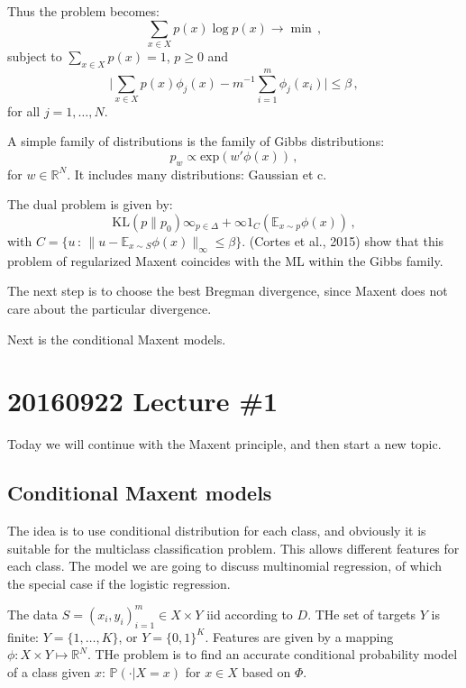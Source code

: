\documentclass[a4paper]{article}
\newcommand{\Real}{\mathbb{R}}
\newcommand{\ex}{\mathbb{E}}
\newcommand{\pr}{\mathbb{P}}
\begin{document}
Thus the problem becomes:
\[ \sum_{x\in X} p(x) \log p(x) \to \min \,, \]
subject to $\sum_{x\in X} p(x) = 1$, $p \geq 0$ and
\[ \bigl|\sum_{x\in X} p(x) \phi_j(x) - m^{-1} \sum_{i=1}^m \phi_j(x_i) \bigr|
    \leq \beta \,,\]
for all $j=1,\ldots, N$.

A simple family of distributions is the family of Gibbs distributions:
\[ p_w \propto \text{exp}(w' \phi(x)) \,, \]
for $w\in \Real^N$. It includes many distributions: Gaussian et c.

The dual problem is given by:
\[ \text{KL}(p\|p_0) \infty_{p\in \Delta} + \infty 1_C(\ex_{x\sim p} \phi(x)) \,,\]
with $C = \{u\,:\, \|u - \ex_{x\sim S} \phi(x) \|_\infty \leq \beta \}$. (Cortes
et al., 2015) show that this problem of regularized Maxent coincides with the ML
within the Gibbs family.

The next step is to choose the best Bregman divergence, since Maxent does not care
about the particular divergence.

\noindent Next is the conditional Maxent models.



% 

\section{20160922 Lecture \#1} %
\label{sec:20160922_lecture_1}

Today we will continue with the Maxent principle, and then start a new topic.

\subsection{Conditional Maxent models} %
\label{sub:conditional_maxent_models}

The idea is to use conditional distribution for each class, and obviously it is
suitable for the multiclass classification problem. This allows different features
for each class. The model we are going to discuss multinomial regression, of which
the special case if the logistic regression.

The data $S=(x_i, y_i)_{i=1}^m\in X\times Y$ iid according to $D$. THe set of targets
$Y$ is finite: $Y=\{1,\ldots,K\}$, or $Y=\{0, 1\}^K$. Features are given by a mapping
$\phi:X\times Y \mapsto \Real^N$. THe problem is to find an accurate conditional
probability model of a class given $x$: $\pr(\cdot|X=x)$ for $x\in X$ based on $\Phi$.
\end{document}

